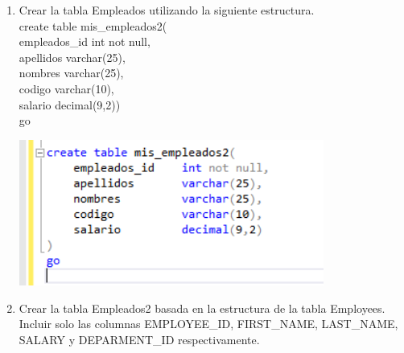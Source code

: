 \begin{enumerate}[1.]
\begin{center}
	\end{center}
	\item Crear la tabla Empleados utilizando la siguiente estructura.
	\\create table mis_empleados2(
	\\empleados\_id	int not null,
	\\apellidos		varchar(25),
	\\nombres			varchar(25),
	\\codigo			varchar(10),
	\\salario			decimal(9,2))
	\\go
	\begin{center}
	\includegraphics[width=10cm]{./Imagenes/prac2eje3} 
	\end{center}
	\item Crear la tabla Empleados2 basada en la estructura de la tabla Employees. Incluir solo las columnas EMPLOYEE\_ID, FIRST\_NAME, LAST\_NAME, SALARY y DEPARMENT\_ID 		respectivamente.
	

\end{enumerate}
